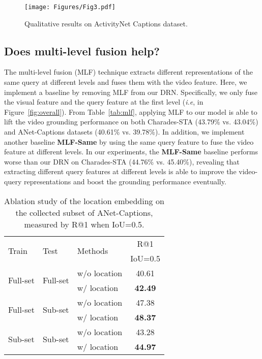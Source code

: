 \documentclass[10pt,twocolumn,letterpaper]{article}
\def\ie{\emph{i.e}\onedot} \def\Ie{\emph{I.e}\onedot}
\begin{document}
	
	\begin{figure*}[!t]
\texttt{[image: Figures/Fig3.pdf]}
		\caption{Qualitative results on ActivityNet Captions dataset.}
		\label{fig:visualization}
	\end{figure*}
	
	\subsection{Does multi-level fusion help?}
	
	The multi-level fusion (MLF) technique extracts different representations of the same query at different levels and fuses them with the video feature. Here, we implement a baseline by removing MLF from our DRN. Specifically, we only fuse the visual feature and the query feature at the first level (\ie,  in Figure~\ref{fig:overall}). From Table~\ref{tab:mlf}, applying MLF to our model is able to lift the video grounding performance on both Charades-STA (43.79\% vs. 43.04\%) and ANet-Captions datasets (40.61\% vs. 39.78\%). In addition, we implement another baseline \textbf{MLF-Same} by using the same query feature to fuse the video feature at different levels. In our experiments, the \textbf{MLF-Same} baseline performs worse than our DRN on Charades-STA (44.76\% vs. 45.40\%), revealing that extracting different query features at different levels is able to improve the video-query representations and boost the grounding performance eventually. 
	
\begin{table}[!t]
	\centering
	\caption{Ablation study of the location embedding on the collected subset of ANet-Captions, measured by R@1 when IoU=0.5.}
	\begin{tabular}{l|l|l|c}
		\hline
		\multirow{2}{*}{Train} & \multirow{2}{*}{Test} & \multirow{2}{*}{Methods} & R@1         \\
		&      &                    & IoU=0.5 \\ \hline
		\multirow{2}{*}{Full-set}  & \multirow{2}{*}{Full-set}   &    w/o location      & 40.61   \\  
		&  &  w/ location         &  \textbf{42.49}   \\ \hline
		\multirow{2}{*}{Full-set}  & \multirow{2}{*}{Sub-set}   &    w/o location      & 47.38   \\ 
		&  &  w/ location         &  \textbf{48.37}   \\
		\hline 
		\multirow{2}{*}{Sub-set}  & \multirow{2}{*}{Sub-set}   &   w/o location                   & 43.28       \\
		&   & w/ location                 & \textbf{44.97 }     \\
		\hline
	\end{tabular}\label{tab:temporal}
			\vspace{-0.1in}
\end{table}
	
\end{document}
